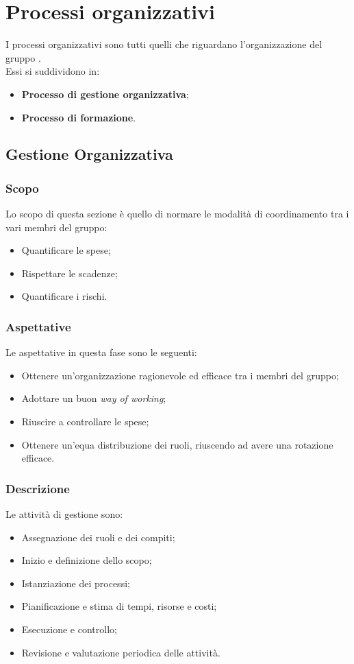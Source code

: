 \section{Processi organizzativi}\label{section:processi_organizzativi}
I processi organizzativi sono tutti quelli che riguardano l'organizzazione del gruppo \groupName.\\ Essi si suddividono in:
\begin{itemize}
  \item \textbf{Processo di gestione organizzativa};
  \item \textbf{Processo di formazione}.
\end{itemize}

\subsection{Gestione Organizzativa} \label{subsection:gestione_organizzativa}
\subsubsection {Scopo}
Lo scopo di questa sezione è quello di normare le modalità di coordinamento tra i vari membri del gruppo:
\begin {itemize}
\item Quantificare le spese;
\item Rispettare le scadenze;
\item Quantificare i rischi.
\end{itemize}
\subsubsection{Aspettative}
Le aspettative in questa fase sono le seguenti:
\begin {itemize}
\item Ottenere un'organizzazione ragionevole ed efficace tra i membri del gruppo;
\item Adottare un buon \textit{way of working};
\item Riuscire a controllare le spese;
\item Ottenere un'equa distribuzione dei ruoli, riuscendo ad avere una rotazione efficace.
\end {itemize}
\subsubsection{Descrizione}
Le attività di gestione sono:
\begin {itemize}
\item Assegnazione dei ruoli e dei compiti;
\item Inizio e definizione dello scopo;
\item Istanziazione dei processi;
\item Pianificazione e stima di tempi, risorse e costi;
\item Esecuzione e controllo;
\item Revisione e valutazione periodica delle attività.
\end {itemize}

